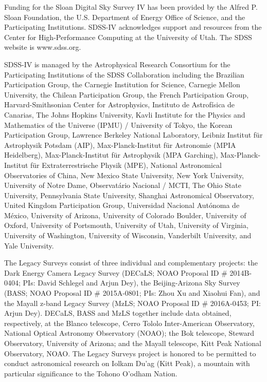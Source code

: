 \documentclass[letter]{aa}
\begin{document}
\begin{acknowledgements}
Funding for the Sloan Digital Sky Survey IV has been provided by the Alfred P. Sloan Foundation, the U.S. Department of Energy Office of Science, and the Participating Institutions. SDSS-IV acknowledges
support and resources from the Center for High-Performance Computing at the University of Utah. The SDSS website is www.sdss.org.

SDSS-IV is managed by the Astrophysical Research Consortium for the
Participating Institutions of the SDSS Collaboration including the
Brazilian Participation Group, the Carnegie Institution for Science,
Carnegie Mellon University, the Chilean Participation Group, the French Participation Group, Harvard-Smithsonian Center for Astrophysics,
Instituto de Astrof\'isica de Canarias, The Johns Hopkins University, Kavli Institute for the Physics and Mathematics of the Universe (IPMU) /
University of Tokyo, the Korean Participation Group, Lawrence Berkeley National Laboratory,
Leibniz Institut f\"ur Astrophysik Potsdam (AIP),
Max-Planck-Institut f\"ur Astronomie (MPIA Heidelberg),
Max-Planck-Institut f\"ur Astrophysik (MPA Garching),
Max-Planck-Institut f\"ur Extraterrestrische Physik (MPE),
National Astronomical Observatories of China, New Mexico State University,
New York University, University of Notre Dame,
Observat\'ario Nacional / MCTI, The Ohio State University,
Pennsylvania State University, Shanghai Astronomical Observatory,
United Kingdom Participation Group,
Universidad Nacional Aut\'onoma de M\'exico, University of Arizona,
University of Colorado Boulder, University of Oxford, University of Portsmouth,
University of Utah, University of Virginia, University of Washington, University of Wisconsin,
Vanderbilt University, and Yale University.

The Legacy Surveys consist of three individual and complementary projects: the Dark Energy Camera Legacy Survey (DECaLS; NOAO Proposal ID \# 2014B-0404; PIs: David Schlegel and Arjun Dey), the Beijing-Arizona Sky Survey (BASS; NOAO Proposal ID \# 2015A-0801; PIs: Zhou Xu and Xiaohui Fan), and the Mayall z-band Legacy Survey (MzLS; NOAO Proposal ID \# 2016A-0453; PI: Arjun Dey). DECaLS, BASS and MzLS together include data obtained, respectively, at the Blanco telescope, Cerro Tololo Inter-American Observatory, National Optical Astronomy Observatory (NOAO); the Bok telescope, Steward Observatory, University of Arizona; and the Mayall telescope, Kitt Peak National Observatory, NOAO. The Legacy Surveys project is honored to be permitted to conduct astronomical research on Iolkam Du'ag (Kitt Peak), a mountain with particular significance to the Tohono O'odham Nation.


\end{acknowledgements}
\end{document}
